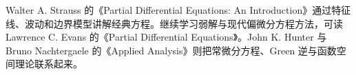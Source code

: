 \ProseParagraphBreak

Walter A. Strauss 的《Partial Differential Equations: An Introduction》\cite{Strauss2008Partial}通过特征线、波动和边界模型讲解经典方程。继续学习弱解与现代偏微分方程方法，可读 Lawrence C. Evans 的《Partial Differential Equations》\cite{Evans2010Partial}。John K. Hunter 与 Bruno Nachtergaele 的《Applied Analysis》\cite{Hunter2001Applied}则把常微分方程、Green 逆与函数空间理论联系起来。








